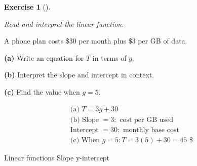 \documentclass[
  letterpaper,
  DIV=11,
  numbers=noendperiod]{scrreprt}
\theoremstyle{definition}
\newtheorem{exercise}{Exercise}[chapter]
\theoremstyle{remark}
\begin{document}
\begin{exercise}[]\protect\hypertarget{exr-u7-9}{}\label{exr-u7-9}

\emph{Read and interpret the linear function.}

A phone plan costs \$30 per month plus \$3 per GB of data.

\textbf{(a)} Write an equation for \(T\) in terms of \(g\).

\textbf{(b)} Interpret the slope and intercept in context.

\textbf{(c)} Find the value when \(g = 5\).

\begin{tcolorbox}[enhanced jigsaw, opacitybacktitle=0.6, coltitle=black, arc=.35mm, colframe=quarto-callout-tip-color-frame, colback=white, bottomrule=.15mm, left=2mm, colbacktitle=quarto-callout-tip-color!10!white, titlerule=0mm, opacityback=0, title=\textcolor{quarto-callout-tip-color}{\faLightbulb}\hspace{0.5em}{🔍 View Solution}, leftrule=.75mm, breakable, rightrule=.15mm, bottomtitle=1mm, toptitle=1mm, toprule=.15mm]

\[
\begin{aligned}
\text{(a) } T = 3g + 30 \\[4pt] \text{(b) Slope } = 3: \text{ cost per GB used} \\[4pt] \text{Intercept } = 30: \text{ monthly base cost} \\[4pt] \text{(c) When } g = 5: T = 3(5) + 30 = 45 \text{ \$}
\end{aligned}
\]

\end{tcolorbox}

{Linear functions} {Slope} {y-intercept}

\end{exercise}
\end{document}
